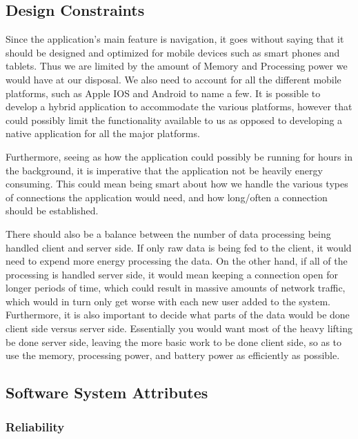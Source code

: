 \documentclass[11pt]{article}
\begin{document}
	\subsection{Design Constraints}

	Since the application’s main feature is navigation, it goes without saying that it should be designed and optimized for mobile devices such as smart phones and tablets.  Thus we are limited by the amount of Memory and Processing power we would have at our disposal.  We also need to account for all the different mobile platforms, such as Apple IOS and Android to name a few.  It is possible to develop a hybrid application to accommodate the various platforms, however that could possibly limit the functionality available to us as opposed to developing a native application for all the major platforms.  

	

	Furthermore, seeing as how the application could possibly be running for hours in the background, it is imperative that the application not be heavily energy consuming.  This could mean being smart about how we handle the various types of connections the application would need, and how long/often a connection should be established.  

	

	There should also be a balance between the number of data processing being handled client and server side.  If only raw data is being fed to the client, it would need to expend more energy processing the data.  On the other hand, if all of the processing is handled server side, it would mean keeping a connection open for longer periods of time, which could result in massive amounts of network traffic, which would in turn only get worse with each new user added to the system.  Furthermore, it is also important to decide what parts of the data would be done client side versus server side.  Essentially you would want most of the heavy lifting be done server side, leaving the more basic work to be done client side, so as to use the memory, processing power, and battery power as efficiently as possible.   

	

	

	\subsection{Software System Attributes}

	

		\subsubsection{Reliability}
\end{document}
